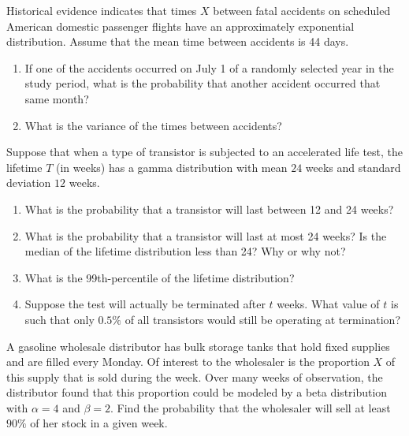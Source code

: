 \documentclass[12pt,reqno]{amsart}
\begin{document}
\newpage
\prob Historical evidence indicates that times $X$ between fatal accidents on scheduled American domestic passenger flights have an approximately exponential distribution. Assume that the mean time between accidents is 44 days.

\medskip
\begin{enumerate}
\item If one of the accidents occurred on July 1 of a randomly selected year in the study period, what is the probability that another accident occurred that same month?\vfill
\item What is the variance of the times between accidents?\vfill
\end{enumerate}













\bigskip
\prob Suppose that when a type of transistor is subjected to an accelerated life test, the lifetime $T$ (in weeks) has a gamma distribution with mean $24$ weeks and standard deviation $12$ weeks.

\medskip
\begin{enumerate}
\item What is the probability that a transistor will last between 12 and 24 weeks?\vfill
\item What is the probability that a transistor will last at most 24 weeks? Is the median of the lifetime distribution less than 24? Why or why not?\vfill
\item What is the 99th-percentile of the lifetime distribution?\vfill
\item Suppose the test will actually be terminated after $t$ weeks. What value of $t$ is such that only $0.5\%$ of all transistors would still be operating at termination?\vfill
\end{enumerate}










\newpage
\prob A gasoline wholesale distributor has bulk storage tanks that hold fixed supplies and are filled every Monday. Of interest to the wholesaler is the proportion $X$ of this supply that is sold during the week. Over many weeks of observation, the distributor found that this proportion could be modeled by a beta distribution with $\alpha = 4$ and $\beta = 2$. Find the probability that the wholesaler will sell at least $90\%$ of her stock in a given week.
\end{document}
